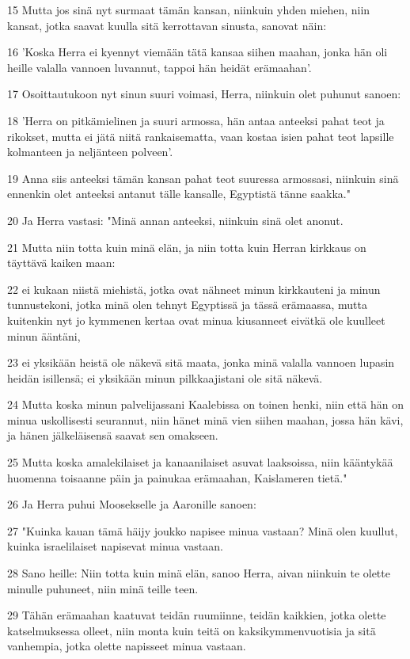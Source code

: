 \par 15 Mutta jos sinä nyt surmaat tämän kansan, niinkuin yhden miehen, niin kansat, jotka saavat kuulla sitä kerrottavan sinusta, sanovat näin:
\par 16 'Koska Herra ei kyennyt viemään tätä kansaa siihen maahan, jonka hän oli heille valalla vannoen luvannut, tappoi hän heidät erämaahan'.
\par 17 Osoittautukoon nyt sinun suuri voimasi, Herra, niinkuin olet puhunut sanoen:
\par 18 'Herra on pitkämielinen ja suuri armossa, hän antaa anteeksi pahat teot ja rikokset, mutta ei jätä niitä rankaisematta, vaan kostaa isien pahat teot lapsille kolmanteen ja neljänteen polveen'.
\par 19 Anna siis anteeksi tämän kansan pahat teot suuressa armossasi, niinkuin sinä ennenkin olet anteeksi antanut tälle kansalle, Egyptistä tänne saakka."
\par 20 Ja Herra vastasi: "Minä annan anteeksi, niinkuin sinä olet anonut.
\par 21 Mutta niin totta kuin minä elän, ja niin totta kuin Herran kirkkaus on täyttävä kaiken maan:
\par 22 ei kukaan niistä miehistä, jotka ovat nähneet minun kirkkauteni ja minun tunnustekoni, jotka minä olen tehnyt Egyptissä ja tässä erämaassa, mutta kuitenkin nyt jo kymmenen kertaa ovat minua kiusanneet eivätkä ole kuulleet minun ääntäni,
\par 23 ei yksikään heistä ole näkevä sitä maata, jonka minä valalla vannoen lupasin heidän isillensä; ei yksikään minun pilkkaajistani ole sitä näkevä.
\par 24 Mutta koska minun palvelijassani Kaalebissa on toinen henki, niin että hän on minua uskollisesti seurannut, niin hänet minä vien siihen maahan, jossa hän kävi, ja hänen jälkeläisensä saavat sen omakseen.
\par 25 Mutta koska amalekilaiset ja kanaanilaiset asuvat laaksoissa, niin kääntykää huomenna toisaanne päin ja painukaa erämaahan, Kaislameren tietä."
\par 26 Ja Herra puhui Moosekselle ja Aaronille sanoen:
\par 27 "Kuinka kauan tämä häijy joukko napisee minua vastaan? Minä olen kuullut, kuinka israelilaiset napisevat minua vastaan.
\par 28 Sano heille: Niin totta kuin minä elän, sanoo Herra, aivan niinkuin te olette minulle puhuneet, niin minä teille teen.
\par 29 Tähän erämaahan kaatuvat teidän ruumiinne, teidän kaikkien, jotka olette katselmuksessa olleet, niin monta kuin teitä on kaksikymmenvuotisia ja sitä vanhempia, jotka olette napisseet minua vastaan.
